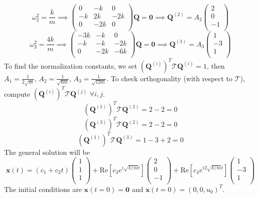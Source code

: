 \documentclass[a4paper]{article}
\begin{document}
\begin{ans}
$$\omega_2^2=\frac{k}{m}\implies\begin{pmatrix}0&-k&0\\-k&2k&-2k\\0&-2k&0\\\end{pmatrix}\mathbf{Q}=\boldsymbol{0}\implies\mathbf{Q}^{(2)}=A_2\begin{pmatrix}2\\0\\-1\\\end{pmatrix}$$
$$\omega_3^2=\frac{4k}{m}\implies\begin{pmatrix}-3k&-k&0\\-k&-k&-2k\\0&-2k&-6k\\\end{pmatrix}\mathbf{Q}=\boldsymbol{0}\implies\mathbf{Q}^{(3)}=A_3\begin{pmatrix}1\\-3\\1\\\end{pmatrix}$$
To find the normalization constants, we set $(\mathbf{Q}^{(i)})^T\mathcal{T}\mathbf{Q}^{(i)}=1$, then $A_1=\frac{1}{2\sqrt{m}}$, $A_2=\frac{1}{\sqrt{6m}}$, $A_3=\frac{1}{\sqrt{12m}}$. To check orthogonality (with respect to $\mathcal{T}$), compute $(\mathbf{Q}^{(i)})^T\mathcal{T}\mathbf{Q}^{(j)}$ $\forall i,j$. 
$$(\mathbf{Q}^{(1)})^T\mathcal{T}\mathbf{Q}^{(2)}=2-2=0$$
$$(\mathbf{Q}^{(3)})^T\mathcal{T}\mathbf{Q}^{(2)}=2-2=0$$
$$(\mathbf{Q}^{(1)})^T\mathcal{T}\mathbf{Q}^{(3)}=1-3+2=0$$
The general solution will be
$$\mathbf{x}(t)=(c_1+c_2t)\begin{pmatrix}1\\1\\1\\\end{pmatrix}+\text{Re}[c_3e^{i\sqrt{k/m}t}]\begin{pmatrix}2\\0\\-1\\\end{pmatrix}+\text{Re}[c_4e^{i2\sqrt{k/m}t}]\begin{pmatrix}1\\-3\\1\\\end{pmatrix}$$
The initial conditions are $\mathbf{x}(t=0)=\boldsymbol{0}$ and $\mathbf{\dot{x}}(t=0)=(0,0,u_0)^T$.

\end{ans}
\end{document}
